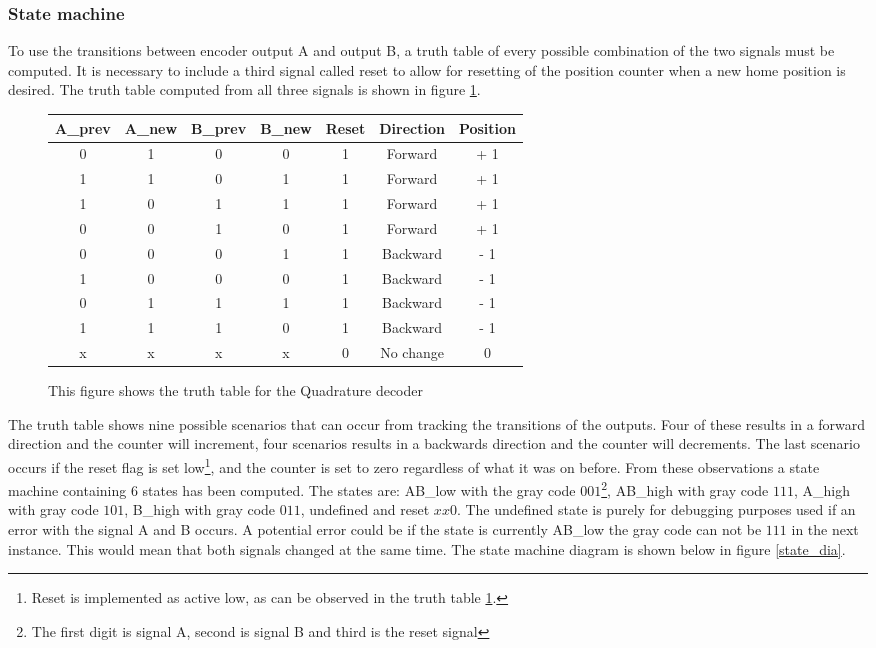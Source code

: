 \documentclass[../../../main]{subfiles}
\begin{document}
\subsubsection{State machine}
To use the transitions between encoder output A and output B, a truth table of every possible combination of the two signals must be computed. It is necessary to include a third signal called reset to allow for resetting of the position counter when a new home position is desired. The truth table computed from all three signals is shown in figure \ref{fig:truth_table}.
\begin{figure}[H]
  \begin{tabular}{|c | c | c | c | c | c |c|}
  \hline
   A\_prev & A\_new & B\_prev & B\_new & Reset & Direction & Position \\
   \hline
   0 & 1 & 0 & 0 & 1 & Forward & + 1 \\
   1 & 1 & 0 & 1 & 1 & Forward & + 1 \\
   1 & 0 & 1 & 1 & 1 & Forward & + 1 \\
   0 & 0 & 1 & 0 & 1 & Forward & + 1 \\
   0 & 0 & 0 & 1 & 1 & Backward & - 1 \\
   1 & 0 & 0 & 0 & 1 & Backward & - 1 \\
   0 & 1 & 1 & 1 & 1 & Backward & - 1 \\
   1 & 1 & 1 & 0 & 1 & Backward & - 1 \\
   x & x & x & x & 0 & No change &  0 \\
   \hline
  \end{tabular}
  \caption{This figure shows the truth table for the Quadrature decoder}
  \label{fig:truth_table}
\end{figure}
The truth table shows nine possible scenarios that can occur from tracking the transitions of the outputs. Four of these results in a forward direction and the counter will increment, four scenarios results in a backwards direction and the counter will decrements. The last scenario occurs if the reset flag is set low\footnote{Reset is implemented as active low, as can be observed in the truth table \ref{fig:truth_table}.}, and the counter is set to zero regardless of what it was on before. From these observations a state machine containing 6 states has been computed. The states are: AB\_low with the gray code $001$\footnote{The first digit is signal A, second is signal B and third is the reset signal}, AB\_high with gray code $111$, A\_high with gray code $101$, B\_high with gray code $011$, undefined and reset $xx0$. The undefined state is purely for debugging purposes used if an error with the signal A and B occurs. A potential error could be if the state is currently AB\_low the gray code can not be $111$ in the next instance. This would mean that both signals changed at the same time. The state machine diagram is shown below in figure \ref{state_dia}. \\
\end{document}
